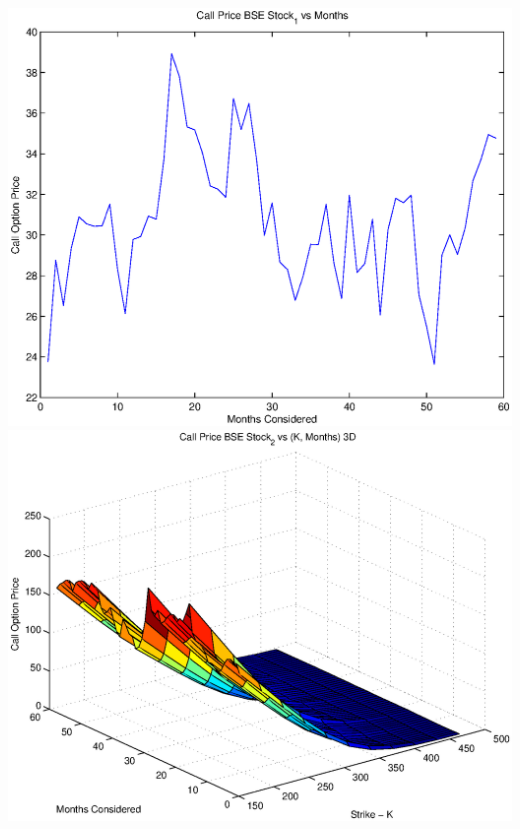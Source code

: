 \documentclass{article}
\begin{document}
\includegraphics[width=\textwidth]{Call_Price_BSE_Stock_1_vs_Months} \\

\includegraphics[width=\textwidth]{Call_Price_BSE_Stock_2_vs_(K,_Months)_3D} \\
\end{document}
